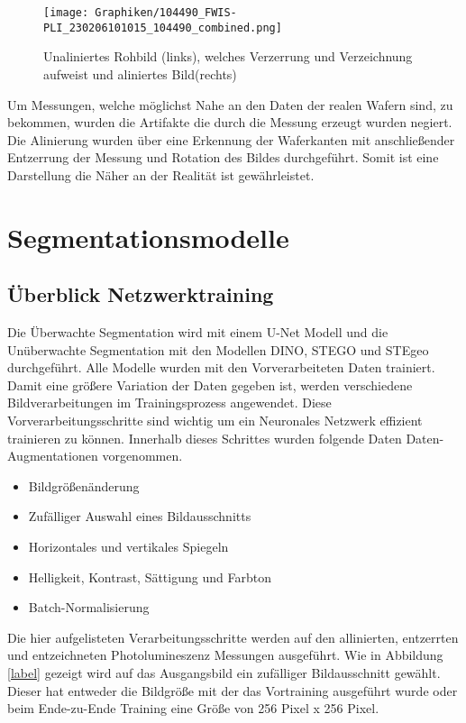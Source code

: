\begin{figure}[!ht]
	\centering
	\texttt{[image: Graphiken/104490\_FWIS-PLI\_230206101015\_104490\_combined.png]}
	\caption{Unaliniertes Rohbild (links), welches Verzerrung und Verzeichnung aufweist und aliniertes Bild(rechts)}
	\label{fig:unallig_allig}
\end{figure}

Um Messungen, welche möglichst Nahe an den Daten der realen Wafern sind, zu bekommen, wurden die Artifakte die durch die Messung erzeugt wurden negiert. Die Alinierung wurden über eine Erkennung der Waferkanten mit anschließender Entzerrung der Messung und Rotation des Bildes durchgeführt. Somit ist eine Darstellung die Näher an der Realität ist gewährleistet.

\section{Segmentationsmodelle}
\subsection{Überblick Netzwerktraining}
	Die Überwachte Segmentation wird mit einem U-Net Modell und die Unüberwachte Segmentation mit den Modellen DINO, STEGO und STEgeo durchgeführt. Alle Modelle wurden mit den Vorverarbeiteten Daten trainiert. \\
	Damit eine größere Variation der Daten gegeben ist, werden verschiedene Bildverarbeitungen im Trainingsprozess angewendet. Diese Vorverarbeitungsschritte sind wichtig um ein Neuronales Netzwerk effizient trainieren zu können. Innerhalb dieses Schrittes wurden folgende Daten Daten-Augmentationen vorgenommen.
	 
	\begin{itemize}
		\item Bildgrößenänderung
		\item Zufälliger Auswahl eines Bildausschnitts
		\item Horizontales und vertikales Spiegeln
		\item Helligkeit, Kontrast, Sättigung und Farbton
		\item Batch-Normalisierung
	\end{itemize} 
	
	Die hier aufgelisteten Verarbeitungsschritte werden auf den allinierten, entzerrten und entzeichneten Photolumineszenz Messungen ausgeführt. Wie in Abbildung \ref{label} gezeigt wird auf das Ausgangsbild ein zufälliger Bildausschnitt gewählt. Dieser hat entweder die Bildgröße mit der das Vortraining ausgeführt wurde oder beim Ende-zu-Ende Training eine Größe von 256 Pixel x 256 Pixel.
	
